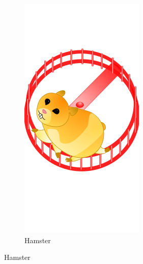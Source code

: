 \begin{figure}
      \begin{subfigure}[b]{0.3\textwidth}
        \includegraphics[width=\textwidth]{ic_hamster2.png}
        \caption{Hamster}
      \end{subfigure}
      \label{fig:icon_types}
    \end{figure}

